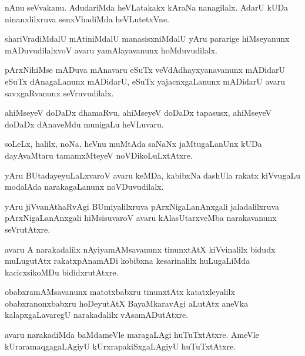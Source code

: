 \documentclass{article}
\begin{document}
\begin{mn}
nAnu seVvakanu. AdudariMda heVLatakakx kAraNa nanagilalx. AdarU kUDa ninanxlilxruva senxVhadiMda 
heVLutetxVne.
\end{mn}

\begin{mn}
shariVradiMdalU mAtiniMdalU manasisxniMdalU yAru pararige hiMseyanunx mADuvudilalxvoV avaru 
yamAlayavanunx hoMduvudilalx.
\end{mn}

\begin{mn}
pArxNihiMse mADuva mAnavaru eSuTx veVdAdhayxyanavanunx mADidarU eSuTx dAnagaLanunx mADidarU, eSuTx
yajacnxgaLanunx mADidarU avaru savxgaRvanunx seVruvudilalx.
\end{mn}

\begin{mn}
ahiMseyeV doDaDx dhamaRvu, ahiMseyeV doDaDx tapasusx, ahiMseyeV doDaDx dAnaveMdu munigaLu heVLuvaru.
\end{mn}

\begin{mn}
soLeLx, halilx, noNa, heVnu muMtAda saNaNx jaMtugaLanUnx kUDa dayAvaMtaru tamamxMteyeV 
noVDikoLuLxtAtxre.
\end{mn}

\begin{mn}
yAru BUtadayeyuLaLxvaroV avaru keMDa, kabibxNa dashUla rakatx kiVvugaLu modalAda narakagaLanunx  
noVDuvudilalx.
\end{mn}

\begin{mn}
yAru jiVvanAthaRvAgi BUmiyalilxruva pArxNigaLanAnxgali jaladalilxruva pArxNigaLanAnxgali 
hiMsisuvaroV avaru kAlasUtarxveMba narakavanunx seVrutAtxre.
\end{mn}

\begin{mn}
avaru A narakadalilx nAyiyamAMsavanunx tinunxtAtX kiVvinalilx bidudx muLugutAtx rakatxpAnamADi
kobibxna kesarinalilx huLugaLiMda kacicxsikoMDu bididxrutAtxre.
\end{mn}

\begin{mn}
obabxramAMsavanunx matotxbabxru tinunxtAtx katatxleyalilx obabxranonxbabxru hoDeyutAtX 
BayaMkaravAgi aLutAtx aneVka kalapxgaLavaregU narakadalilx vAsamADutAtxre.
\end{mn}

\begin{mn}
avaru narakadiMda baMdameVle maragaLAgi huTuTxtAtxre. AmeVle kUraramaqgagaLAgiyU 
kUrxrapakiSxgaLAgiyU huTuTxtAtxre.
\end{mn}
\end{document}

